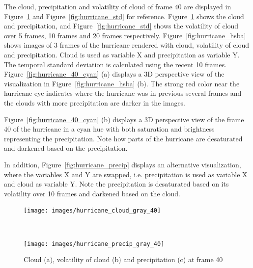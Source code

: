 The cloud, precipitation and volatility of cloud of frame 40 are displayed in Figure~\ref{fig:hurricane_gray} and Figure~\ref{fig:hurricane_std} for reference.
Figure~\ref{fig:hurricane_gray} shows the cloud and precipitation, and Figure~\ref{fig:hurricane_std} shows the volatility of cloud over 5 frames, 10 frames and 20 frames respectively.
Figure~\ref{fig:hurricane_hsba} shows images of 3 frames of the hurricane rendered with cloud, volatility of cloud and precipitation. Cloud is used as variable X and precipitation as variable Y. The temporal standard deviation is calculated using the recent 10 frames.
Figure~\ref{fig:hurricane_40_cyan} (a) displays a 3D perspective view of the visualization in Figure~\ref{fig:hurricane_hsba} (b).
The strong red color near the hurricane eye indicates where the hurricane was in previous several frames and the clouds with more precipitation are darker in the images.

Figure~\ref{fig:hurricane_40_cyan} (b) displays a 3D perspective view of the frame 40 of the hurricane in a cyan hue with both saturation and brightness representing the precipitation. Note how parts of the hurricane are desaturated and darkened based on the precipitation.

In addition, Figure~\ref{fig:hurricane_precip} displays an alternative visualization, where the variables X and Y are swapped, i.e. precipitation is used as variable X and cloud as variable Y. Note the precipitation is desaturated based on its volatility over 10 frames and darkened based on the cloud.

\begin{figure}
\centering
\begin{minipage}{.33\textwidth}
\texttt{[image: images/hurricane\_cloud\_gray\_40]}
\subcaption{}
\end{minipage}~
\begin{minipage}{.33\textwidth}
\texttt{[image: images/hurricane\_precip\_gray\_40]}
\subcaption{}
\end{minipage}
\caption{Cloud (a), volatility of cloud (b) and precipitation (c) at frame 40}
\label{fig:hurricane_gray}
\end{figure}

